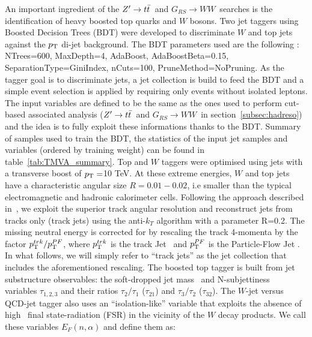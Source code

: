 \documentclass{cernrep}
\newcommand*{\zptt}{\ensuremath{Z^{\prime} \rightarrow \ttbar}}
\newcommand*{\rsg}{\ensuremath{G_{RS} \rightarrow WW}}
\begin{document}
An important ingredient of the \zptt\ and \rsg\ searches is the identification of heavy boosted top quarks and $W$ bosons. Two jet taggers using Boosted Decision Trees (BDT) were developed to discriminate $W$ and top jets against the $p_{\text{T}}$ di-jet background.
\newline
The BDT parameters used are the following : NTrees=600, MaxDepth=4, AdaBoost, AdaBoostBeta=0.15, SeparationType=GiniIndex, nCuts=100, PruneMethod=NoPruning. As the tagger goal is to discriminate jets, a jet collection is build to feed the BDT and a simple event selection is applied by requiring only events without isolated leptons.
The input variables are defined to be the same as the ones used to perform cut-based associated analysis (\zptt\ and \rsg\ in section~\ref{subsec:hadreso}) and the idea is to fully exploit these informations thanks to the BDT. Summary of samples used to train the BDT, the statistics of the input jet samples and variables (ordered by training weight) can be found in table~\ref{tab:TMVA_summary}.
\newline
Top and $W$ taggers were optimised using jets with a transverse boost of $p_{\text{T}}=$10 TeV. At these extreme energies, $W$ and top jets have a characteristic angular size $R=0.01-0.02$, i.e smaller than the typical electromagnetic and hadronic calorimeter cells. Following the approach described in~\cite{Larkoski:2015yqa}, we exploit the superior track angular resolution and reconstruct jets from tracks only (track jets) using the anti-$k_T$ algorithm with a parameter R=0.2. The missing neutral energy is corrected for by rescaling the track 4-momenta by the factor $p_{\text{T}}^{trk}/p_{\text{T}}^{PF}$, where $p_{\text{T}}^{trk}$ is the track Jet \pt\ and $p_{\text{T}}^{PF}$ is the Particle-Flow Jet \pT. In what follows, we will simply refer to ``track jets'' as the jet collection that includes the aforementioned rescaling.
\newline
The boosted top tagger is built from jet substructure observables: the soft-dropped jet mass~\cite{Larkoski:2014wba} and N-subjettiness~\cite{Thaler:2010tr} variables $\tau_{1,2,3}$ and their ratios $\tau_{2}/\tau_{1}$ ($\tau_{21}$) and $\tau_{3}/\tau_{2}$ ($\tau_{32}$). The $W$-jet versus QCD-jet tagger also uses an ``isolation-like'' variable that exploits the absence of high \pt\ final state-radiation (FSR) in the vicinity of the $W$ decay products. We call these variables $E_{F}(n,\alpha)$ and define them as:
\end{document}
